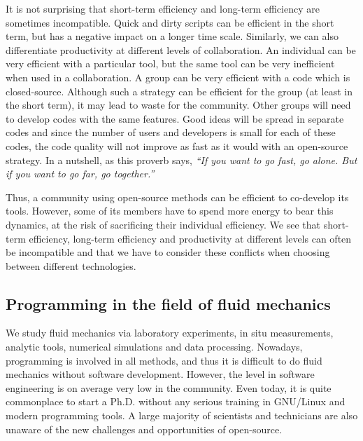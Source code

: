 It is not surprising
%
that short-term efficiency and long-term efficiency are sometimes incompatible.
%
Quick and dirty scripts can be efficient in the short term, but has a negative
impact on a longer time scale.
%
Similarly, we can also differentiate productivity at different levels of
collaboration.
%
An individual can be very efficient with a particular tool, but the same tool
can be very inefficient when used in a collaboration.
%
A group can be very efficient with a code which is closed-source. Although such
a strategy can be efficient for the group (at least in the short term), it may
lead to waste for the community. Other groups will need to develop codes with
the same features.
%
Good ideas will be spread in separate codes and since the number of users and
developers is small for each of these codes, the code quality will not
improve as fast as it would with an open-source strategy. In a nutshell, as
this proverb says, \textit{``If you want to go fast, go alone. But if you want
to go far, go together.''}

Thus, a community using open-source methods can be efficient to co-develop its
tools. However, some of its members have to spend more energy to bear this
dynamics, at the risk of sacrificing their individual efficiency.
We see that short-term efficiency, long-term efficiency and productivity at
different levels can often be incompatible and that we have to consider these
conflicts when choosing between different technologies.

\subsection{Programming in the field of fluid mechanics}

We study fluid mechanics via laboratory experiments, in situ measurements,
analytic tools, numerical simulations and data processing.
%
Nowadays, programming is involved in all methods, and thus it is difficult to do
fluid mechanics without software development.
%
However, the level in software engineering is on average very low in the
community.
%
Even today, it is quite commonplace to start a Ph.D. without any serious
training in GNU/Linux and modern programming tools.
%
A large majority of scientists and technicians are also unaware of the new
challenges and opportunities of open-source.

